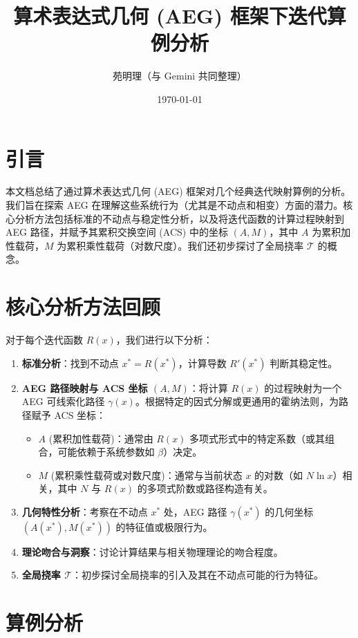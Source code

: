 \documentclass[12pt]{article}
\title{算术表达式几何 (AEG) 框架下迭代算例分析}
\author{苑明理（与 Gemini 共同整理）}
\date{\today}
\begin{document}
\maketitle
\thispagestyle{empty}
\tableofcontents
\newpage

\section{引言}
本文档总结了通过算术表达式几何 (AEG) 框架对几个经典迭代映射算例的分析。我们旨在探索 AEG 在理解这些系统行为（尤其是不动点和相变）方面的潜力。核心分析方法包括标准的不动点与稳定性分析，以及将迭代函数的计算过程映射到 AEG 路径，并赋予其累积交换空间 (ACS) 中的坐标 $(A, M)$，其中 $A$ 为累积加性载荷，$M$ 为累积乘性载荷（对数尺度）。我们还初步探讨了全局挠率 $\mathcal{T}$ 的概念。

\section{核心分析方法回顾}
对于每个迭代函数 $R(x)$，我们进行以下分析：
\begin{enumerate}
    \item \textbf{标准分析}：找到不动点 $x^* = R(x^*)$，计算导数 $R'(x^*)$ 判断其稳定性。
    \item \textbf{AEG 路径映射与 ACS 坐标 $(A,M)$}：将计算 $R(x)$ 的过程映射为一个 AEG 可线索化路径 $\gamma(x)$。根据特定的因式分解或更通用的霍纳法则，为路径赋予 ACS 坐标：
    \begin{itemize}
        \item $A$ (累积加性载荷)：通常由 $R(x)$ 多项式形式中的特定系数（或其组合，可能依赖于系统参数如 $\beta$）决定。
        \item $M$ (累积乘性载荷或对数尺度)：通常与当前状态 $x$ 的对数（如 $N \ln x$）相关，其中 $N$ 与 $R(x)$ 的多项式阶数或路径构造有关。
    \end{itemize}
    \item \textbf{几何特性分析}：考察在不动点 $x^*$ 处，AEG 路径 $\gamma(x^*)$ 的几何坐标 $(A(x^*), M(x^*))$ 的特征值或极限行为。
    \item \textbf{理论吻合与洞察}：讨论计算结果与相关物理理论的吻合程度。
    \item \textbf{全局挠率 $\mathcal{T}$}：初步探讨全局挠率的引入及其在不动点可能的行为特征。
\end{enumerate}

\section{算例分析}
\end{document}
